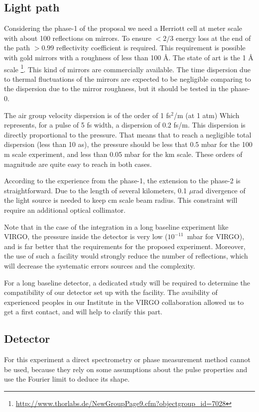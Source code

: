 \documentclass[9pt, a4, twoside]{article}
\begin{document}
\subsection {Light path}

Considering the phase-1 of the proposal we need a Herriott cell at meter scale with about 100 reflections on mirrors. To ensure $< 2/3$ energy loss at the end of the path  $>0.99$ reflectivity coefficient is required. This requirement is possible with gold mirrors with a roughness of less than 100 Å. The state of art is the 1 Å scale  \footnote{\url{http://www.thorlabs.de/NewGroupPage9.cfm?objectgroup_id=7028}}. This kind of mirrors are commercially available. The time dispersion due to thermal fluctuations of the mirrors are expected to be negligible comparing to the dispersion due to the mirror roughness, but it should be tested in the phase-0. 

The air group velocity dispersion is of the order of 1 fs$^2$/m (at 1 atm) \cite{airdispertion} Which represents, for a pulse of 5 fs width, a dispersion of 0.2 fs/m. This dispersion is directly proportional to the pressure. That means that to reach a negligible total dispersion (less than 10 as), the pressure should be less that 0.5 mbar for the 100 m scale experiment, and less than 0.05 mbar for the km scale. These orders of magnitude are quite easy to reach in both cases. 

According to the experience from the phase-1, the extension to the phase-2 is straightforward. Due to the length of several kilometers, 0.1 $\mu$rad divergence of the light source is needed to keep cm scale beam radius. This constraint will require an additional optical collimator.

Note that in the case of the integration in a long baseline experiment like VIRGO, the pressure inside the detector is very low ($10^{-11}$~mbar for VIRGO), and is far better that the requirements for the proposed experiment.
Moreover, the  use of such a facility would strongly reduce the number of  reflections, which will decrease the systematic errors sources and the  complexity.

For a long baseline detector, a dedicated study will be required to determine the compatibility of our detector set up with the facility. The avaibility of experienced peoples in our Institute in the VIRGO collaboration allowed us to get a first contact, and will help to clarify this part.

\subsection {Detector}
\label{sec:detector}
For this experiment a direct spectrometry or phase measurement method cannot be used, because they rely on some assumptions about the pulse properties and use the Fourier limit to deduce its shape.
\end{document}
